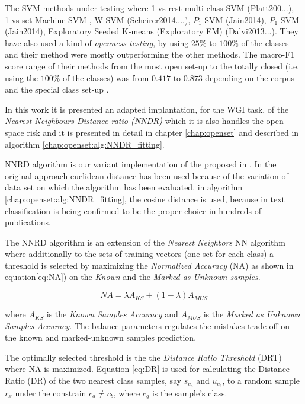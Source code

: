 The SVM methods under testing where 1-vs-rest multi-class SVM (Platt200...), 1-vs-set Machine SVM \parencite{scheirer2013toward}, W-SVM (Scheirer2014....), $P_{1}$-SVM (Jain2014), $P_{1}$-SVM (Jain2014), Exploratory Seeded K-means (Exploratory EM) (Dalvi2013...). They have also used a kind of \textit{openness testing}, by using $25\%$ to $100\%$ of the classes and their method were mostly outperforming the other methods. The macro-F1 score range of their methods from the most open set-up to the totally closed (i.e. using the $100\%$ of the classes) was from $0.417$ to $0.873$ depending on the corpus and the special class set-up \parencite{fei2016breaking}.

In this work it is presented an adapted implantation, for the WGI task, of the \textit{Nearest Neighbours Distance ratio (NNDR)} which it is also handles the open space risk and it is presented in detail in chapter \ref{chap:openset} and described in algorithm \ref{chap:openset:alg:NNDR_fitting}.

NNRD algorithm is our variant implementation of the proposed in \parencite{mendesjunior2016}. In the original approach euclidean distance has been used because of the variation of data set on which the algorithm has been evaluated. in algorithm \ref{chap:openset:alg:NNDR_fitting}, the cosine distance is used, because in text classification is being confirmed to be the proper choice in hundreds of publications. 

The NNRD algorithm is an extension of the \textit{Nearest Neighbors} NN algorithm where additionally to the sets of training vectors (one set for each class) a threshold is selected by maximizing the \textit{Normalized Accuracy} (NA) as shown in equation\ref{eq:NA}) on the \textit{Known} and the \textit{Marked as Unknown samples}.

\begin{equation} \label{eq:NA}
    NA = \lambda A_{KS} + (1 - \lambda) A_{MUS}
\end{equation}

\noindent
where $A_{KS}$ is the \textit{Known Samples Accuracy} and $A_{MUS}$ is the \textit{Marked as Unknown Samples Accuracy}. The balance parameters \lambda regulates the mistakes trade-off on the known and marked-unknown samples prediction.

The optimally selected threshold is the the \textit{Distance Ratio Threshold} (DRT) where NA is maximized. Equation \ref{eq:DR} is used for calculating the Distance Ratio (DR) of the two nearest class samples, say $s_{c_{a}}$ and $u_{c_{b}}$, to a random sample $r_{x}$ under the constrain $c_{a} \neq c_{b}$, where $c_{g}$ is the sample's class.

